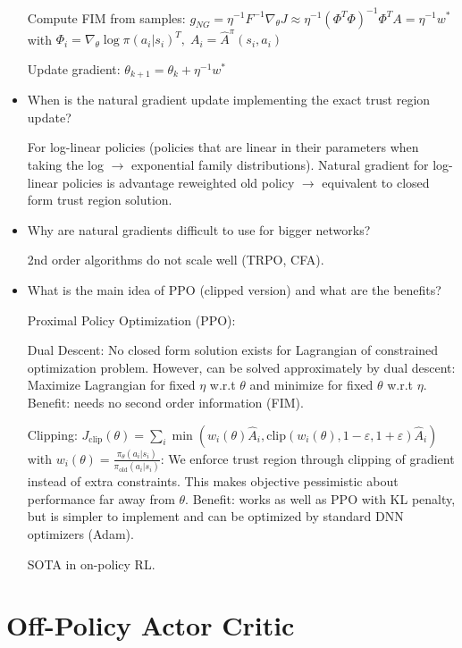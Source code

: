 \documentclass[11pt]{scrartcl}
\begin{document}
\begin{itemize}
    Compute FIM from samples: $g_{NG} = \eta^{-1} F^{-1} \nabla_\theta J \approx 
    \eta^{-1} (\Phi^T \Phi)^{-1} \Phi^T A = \eta^{-1}w^*$ with $\Phi_i = \nabla_\theta \log \pi(a_i|s_i)^T, \; A_i = 
    \hat{A}^\pi(s_i, a_i)$

    Update gradient: $\theta_{k+1} = \theta_k + \eta^{-1}w^*$

    \item When is the natural gradient update implementing the exact trust region update?
    
    For log-linear policies (policies that are linear in their parameters when taking the log $\rightarrow$
    exponential family distributions). Natural gradient for log-linear policies is advantage reweighted old 
    policy $\rightarrow$ equivalent to closed form trust region solution.

    \item Why are natural gradients difficult to use for bigger networks?
    
    2nd order algorithms do not scale well (TRPO, CFA).

    \item What is the main idea of PPO (clipped version) and what are the benefits?
    
    Proximal Policy Optimization (PPO):
    
    Dual Descent: No closed form solution exists for Lagrangian of constrained optimization problem. However,
    can be solved approximately by dual descent: Maximize Lagrangian for fixed $\eta$ w.r.t $\theta$ and
    minimize for fixed $\theta$ w.r.t $\eta$. Benefit: needs no second order information (FIM).

    Clipping: $J_\mathrm{clip}(\theta) = \sum_i \min(w_i(\theta)\hat{A}_i, 
    \mathrm{clip}(w_i(\theta),1 - \varepsilon, 1 + \varepsilon)\hat{A}_i)$ with $w_i(\theta) = 
    \frac{\pi_\theta(a_i|s_i)}{\pi_\mathrm{old}(a_i|s_i)}$: We enforce trust region through
    clipping of gradient instead of extra constraints. This makes objective pessimistic about performance far
    away from $\theta$. Benefit: works as well as PPO with KL penalty, but is
    simpler to implement and can be optimized by standard DNN optimizers (Adam).

    SOTA in on-policy RL.
\end{itemize}

\section{Off-Policy Actor Critic}
\end{document}
